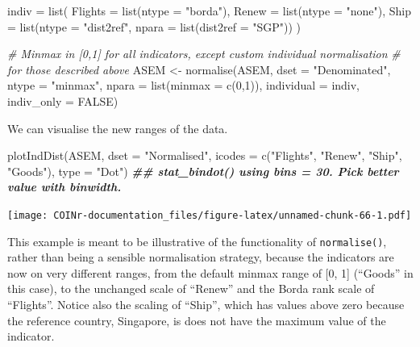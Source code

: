 \documentclass[
]{book}
\newenvironment{Shaded}{\begin{snugshade}}{\end{snugshade}}
\newcommand{\AttributeTok}[1]{\textcolor[rgb]{0.77,0.63,0.00}{#1}}
\newcommand{\CommentTok}[1]{\textcolor[rgb]{0.56,0.35,0.01}{\textit{#1}}}
\newcommand{\ConstantTok}[1]{\textcolor[rgb]{0.00,0.00,0.00}{#1}}
\newcommand{\DecValTok}[1]{\textcolor[rgb]{0.00,0.00,0.81}{#1}}
\newcommand{\DocumentationTok}[1]{\textcolor[rgb]{0.56,0.35,0.01}{\textbf{\textit{#1}}}}
\newcommand{\FunctionTok}[1]{\textcolor[rgb]{0.00,0.00,0.00}{#1}}
\newcommand{\NormalTok}[1]{#1}
\newcommand{\OtherTok}[1]{\textcolor[rgb]{0.56,0.35,0.01}{#1}}
\newcommand{\StringTok}[1]{\textcolor[rgb]{0.31,0.60,0.02}{#1}}
\begin{document}
\begin{Shaded}
\begin{Highlighting}[]
\NormalTok{indiv }\OtherTok{=} \FunctionTok{list}\NormalTok{(}
  \AttributeTok{Flights =} \FunctionTok{list}\NormalTok{(}\AttributeTok{ntype =} \StringTok{"borda"}\NormalTok{),}
  \AttributeTok{Renew =} \FunctionTok{list}\NormalTok{(}\AttributeTok{ntype =} \StringTok{"none"}\NormalTok{),}
  \AttributeTok{Ship =} \FunctionTok{list}\NormalTok{(}\AttributeTok{ntype =} \StringTok{"dist2ref"}\NormalTok{, }\AttributeTok{npara =} \FunctionTok{list}\NormalTok{(}\AttributeTok{dist2ref =} \StringTok{"SGP"}\NormalTok{))}
\NormalTok{)}

\CommentTok{\# Minmax in [0,1] for all indicators, except custom individual normalisation}
\CommentTok{\# for those described above}
\NormalTok{ASEM }\OtherTok{\textless{}{-}} \FunctionTok{normalise}\NormalTok{(ASEM, }\AttributeTok{dset =} \StringTok{"Denominated"}\NormalTok{, }\AttributeTok{ntype =} \StringTok{"minmax"}\NormalTok{, }\AttributeTok{npara =} \FunctionTok{list}\NormalTok{(}\AttributeTok{minmax =} \FunctionTok{c}\NormalTok{(}\DecValTok{0}\NormalTok{,}\DecValTok{1}\NormalTok{)),}
                  \AttributeTok{individual =}\NormalTok{ indiv, }\AttributeTok{indiv\_only =} \ConstantTok{FALSE}\NormalTok{)}
\end{Highlighting}
\end{Shaded}

We can visualise the new ranges of the data.

\begin{Shaded}
\begin{Highlighting}[]
\FunctionTok{plotIndDist}\NormalTok{(ASEM, }\AttributeTok{dset =} \StringTok{"Normalised"}\NormalTok{,}
            \AttributeTok{icodes =} \FunctionTok{c}\NormalTok{(}\StringTok{"Flights"}\NormalTok{, }\StringTok{"Renew"}\NormalTok{, }\StringTok{"Ship"}\NormalTok{, }\StringTok{"Goods"}\NormalTok{), }\AttributeTok{type =} \StringTok{"Dot"}\NormalTok{)}
\DocumentationTok{\#\# \textasciigrave{}stat\_bindot()\textasciigrave{} using \textasciigrave{}bins = 30\textasciigrave{}. Pick better value with \textasciigrave{}binwidth\textasciigrave{}.}
\end{Highlighting}
\end{Shaded}

\texttt{[image: COINr-documentation\_files/figure-latex/unnamed-chunk-66-1.pdf]}

This example is meant to be illustrative of the functionality of \texttt{normalise()}, rather than being a sensible normalisation strategy, because the indicators are now on very different ranges, from the default minmax range of {[}0, 1{]} (``Goods'' in this case), to the unchanged scale of ``Renew'' and the Borda rank scale of ``Flights''. Notice also the scaling of ``Ship'', which has values above zero because the reference country, Singapore, is does not have the maximum value of the indicator.
\end{document}
